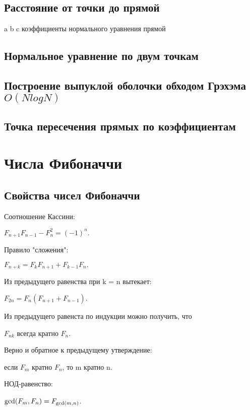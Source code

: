 \documentclass[a4paper]{article}
\begin{document}
\begin{multicols*}{2}
		 \subsection{Расстояние от точки до прямой}
		 a b c коэффициенты нормального уравнения прямой
		 
		 \subsection{Нормальное уравнение по двум точкам}
		 	
		 \subsection{Построение выпуклой оболочки обходом Грэхэма $O (N log N)$}
		 
		 \subsection{Точка пересечения прямых по коэффициентам}
		 
		 
		 \section{Числа Фибоначчи}		 
		 \subsection{Свойства чисел Фибоначчи}
		 
		 Соотношение Кассини:
		 
		 $F_{n+1} F_{n-1} - F_n^2 = (-1)^n.$
		 
		 Правило "сложения":
		 
		 $F_{n+k} = F_k F_{n+1} + F_{k-1} F_n.$ 
		 
		 Из предыдущего равенства при k = n вытекает:
		 
		 $F_{2n} = F_n (F_{n+1} + F_{n-1}).$ 
		 
		 Из предыдущего равенста по индукции можно получить, что
		 
		 $F_{nk}$ всегда кратно $F_n$.
		 
		 Верно и обратное к предыдущему утверждение:
		 
		 если $F_m$ кратно $F_n$, то m кратно n.
		 
		 НОД-равенство:
		 
		 ${\rm gcd} (F_m, F_n) = F_{{\rm gcd} (m, n)}$. 
		 

\end{multicols*}
\end{document}
